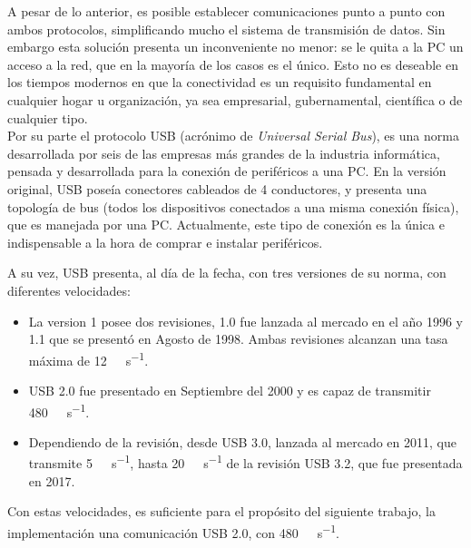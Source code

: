A pesar de lo anterior, es posible establecer comunicaciones punto a punto con ambos protocolos, simplificando mucho el sistema de transmisión de datos. Sin embargo esta solución presenta un inconveniente no menor: se le quita a la PC un acceso a la red, que en la mayoría de los casos es el único. Esto no es deseable en los tiempos modernos en que la conectividad es un requisito fundamental en cualquier hogar u organización, ya sea empresarial, gubernamental, científica o de cualquier tipo.\\

Por su parte el protocolo USB (acrónimo de {\it Universal Serial Bus}), es una norma desarrollada por seis de las empresas más grandes de la industria informática, pensada y desarrollada para la conexión de periféricos a una PC. En la versión original, USB poseía conectores cableados de 4 conductores, y presenta una topología de bus (todos los dispositivos conectados a una misma conexión física), que es manejada por una PC. Actualmente, este tipo de conexión es la única e indispensable a la hora de comprar e instalar periféricos.

A su vez, USB presenta, al día de la fecha, con tres versiones de su norma, con diferentes velocidades: 

\begin{itemize}
	\item La version 1 posee dos revisiones, 1.0 fue lanzada al mercado en el año 1996 y 1.1 que se presentó en Agosto de 1998. Ambas revisiones alcanzan una tasa máxima de \SI{12}{\mega\bit\per\second}. 
	\item USB 2.0 fue presentado en Septiembre del 2000 y es capaz de transmitir \SI{480}{\mega\bit\per\second}.
	\item Dependiendo de la revisión, desde USB 3.0, lanzada al mercado en 2011, que transmite \SI{5}{\giga\bit\per\second}, hasta \SI{20}{\giga\bit\per\second} de la revisión USB 3.2, que fue presentada en 2017.
\end{itemize}

Con estas velocidades, es suficiente para el propósito del siguiente trabajo, la implementación una comunicación USB 2.0, con \SI{480}{\mega\bit\per\second}.\\

